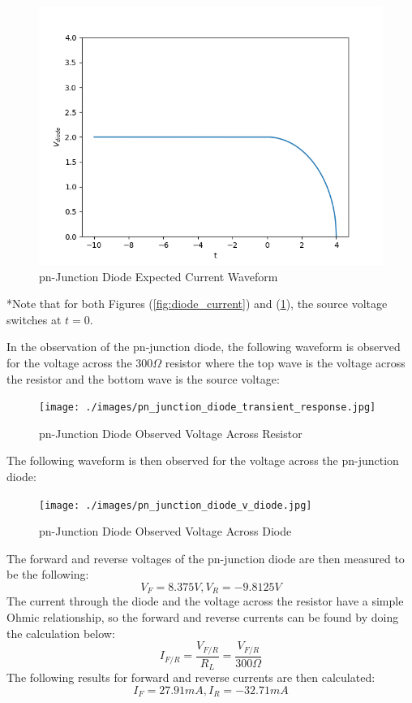 \begin{figure}[h!]
	\centering
	\includegraphics[scale=0.75]{./images/diode_voltage.PNG}
	\caption{pn-Junction Diode Expected Current Waveform}
	\label{fig:diode_voltage}
\end{figure}
\FloatBarrier
*Note that for both Figures (\ref{fig:diode_current}) and (\ref{fig:diode_voltage}), the source voltage switches at $t=0$.

In the observation of the pn-junction diode, the following waveform is observed for the voltage across the $300\Omega$ resistor where the top wave is the voltage across the resistor and the bottom wave is the source voltage:
\FloatBarrier
\begin{figure}[h!]
	\centering
	\texttt{[image: ./images/pn\_junction\_diode\_transient\_response.jpg]}
	\caption{pn-Junction Diode Observed Voltage Across Resistor}
	\label{fig:pn_diode_v_r}
\end{figure}
\FloatBarrier
The following waveform is then observed for the voltage across the pn-junction diode:
\FloatBarrier
\begin{figure}[h!]
	\centering
	\texttt{[image: ./images/pn\_junction\_diode\_v\_diode.jpg]}
	\caption{pn-Junction Diode Observed Voltage Across Diode}
	\label{fig:pn_diode_v_d}
\end{figure}
\FloatBarrier
The forward and reverse voltages of the pn-junction diode are then measured to be the following:
\begin{equation}
\label{eq:pn_measured_vfr}
V_{F}=8.375V,V_{R}=-9.8125V
\end{equation}
The current through the diode and the voltage across the resistor have a simple Ohmic relationship, so the forward and reverse currents can be found by doing the calculation below:
\begin{equation}
\label{eq:ifr_vs_vfr}
I_{F/R}=\frac{V_{F/R}}{R_L}=\frac{V_{F/R}}{300\Omega}
\end{equation}
The following results for forward and reverse currents are then calculated:
\begin{equation}
\label{eq:pn_measured_ifr}
I_{F}=27.91mA,I_{R}=-32.71mA
\end{equation}

